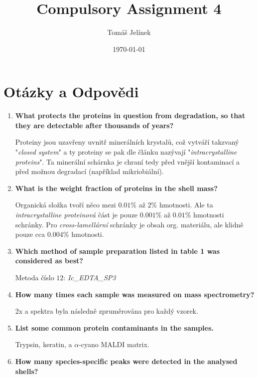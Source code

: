 \documentclass{article}
\title{Compulsory Assignment 4}
\author{Tomáš Jelínek}
\date{\today}
\begin{document}
\maketitle

\section*{Otázky a Odpovědi}

\begin{enumerate}
    \item \textbf{What protects the proteins in question from degradation, so that they are detectable after thousands of years?}

    Proteiny jsou uzavřeny uvnitř minerálních krystalů, což vytváří takzvaný "\textit{closed system}" a ty proteiny se pak dle článku nazývají "\textit{intracrystalline proteins}". Ta minerální schárnka je chraní tedy před vnější kontaminací a před možnou degradací (například mikriobiální).

    \item \textbf{What is the weight fraction of proteins in the shell mass?}

    Organická složka tvoří něco mezi $0.01\%$ až $2\%$ hmotnosti. Ale ta \textit{intracrystalline proteinová} část je pouze $0.001\%$ až $0.01\%$ hmotnosti schránky.
    Pro \textit{cross-lamellární} schránky je obsah org. materiálu, ale klidně pouze cca $0.004\%$ hmotnosti.

    \item \textbf{Which method of sample preparation listed in table 1 was considered as best?}

    Metoda číslo $12$: \textit{Ic\_EDTA\_SP3}

    \item \textbf{How many times each sample was measured on mass spectrometry?}

    2x a spektra byla následně zpruměrována pro každý vzorek.

    \item \textbf{List some common protein contaminants in the samples.}

    Trypsin, keratin, a $\alpha$-cyano MALDI matrix.

    \item \textbf{How many species-specific peaks were detected in the analysed shells?}


\end{enumerate}
\end{document}

